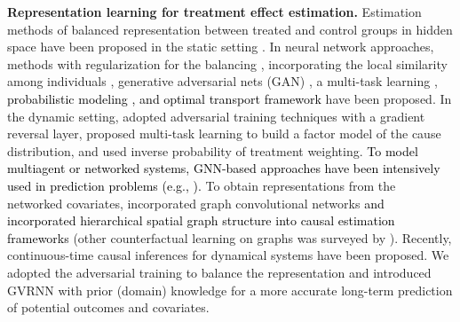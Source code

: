 \documentclass[journal]{IEEEtran}
\begin{document}
\noindent\textbf{Representation learning for treatment effect estimation.}
Estimation methods of balanced representation between treated and control groups in hidden space have been proposed in the static setting \cite{hill2011bayesian,wager2018estimation,alaa2018limits}.
In neural network approaches, methods with regularization for the balancing \cite{johansson2016learning,shalit2017estimating}, incorporating the local similarity among individuals \cite{yao2018representation},  generative adversarial nets (GAN) \cite{yoon2018ganite}, a multi-task learning \cite{shi2019adapting}, \textcolor{black}{probabilistic 
 modeling \cite{grecov2022probabilistic,abroshan2022conservative}, and optimal transport framework \cite{li2021causal}} have been proposed.  
In the dynamic setting, \cite{bica2020estimating,ma2021deconfounding} adopted adversarial training techniques with a gradient reversal layer, \cite{bica2020time} proposed multi-task learning to build a factor model of the cause distribution, and \cite{liu2020estimating} used inverse probability of treatment weighting. 
\textcolor{black}{To model multiagent or networked systems, GNN-based approaches have been intensively used in prediction problems (e.g., \cite{wu2019graph, zhang2020spatio}).} 
To obtain representations from the networked covariates, \cite{ma2021deconfounding} incorporated graph convolutional networks \textcolor{black}{and \cite{takeuchi2023causal} incorporated hierarchical spatial graph structure into causal estimation frameworks}
(other counterfactual learning on graphs was surveyed by \cite{guo2023counterfactual}). Recently, continuous-time causal inferences for dynamical systems \cite{seedat2022continuous,jiang2023cf} have been proposed.
We adopted the adversarial training to balance the representation and introduced GVRNN with prior (domain) knowledge for a more accurate long-term prediction of potential outcomes and covariates.

\end{document}
